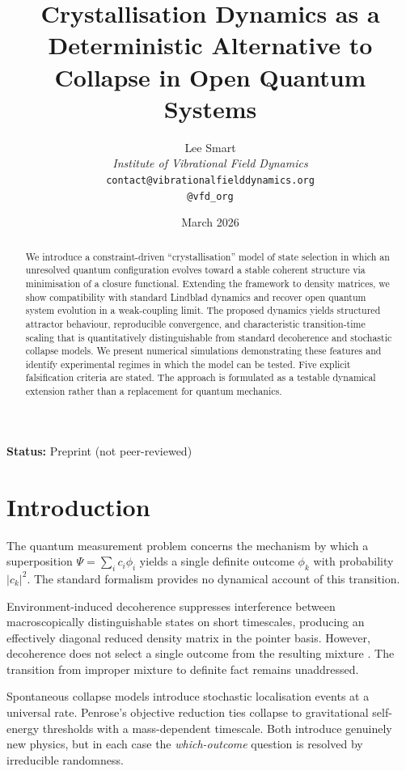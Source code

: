 \documentclass[12pt]{article}
\title{Crystallisation Dynamics as a Deterministic Alternative to Collapse in Open Quantum Systems}
\author{%
  Lee Smart\\[4pt]
  \textit{Institute of Vibrational Field Dynamics}\\[2pt]
  \texttt{contact@vibrationalfielddynamics.org}\\[2pt]
  \texttt{@vfd\_org}%
}
\date{March 2026}
\begin{document}
\maketitle

\noindent\textbf{Status:} Preprint (not peer-reviewed)

\begin{abstract}
We introduce a constraint-driven ``crystallisation'' model of state selection in which an unresolved quantum configuration evolves toward a stable coherent structure via minimisation of a closure functional. Extending the framework to density matrices, we show compatibility with standard Lindblad dynamics and recover open quantum system evolution in a weak-coupling limit. The proposed dynamics yields structured attractor behaviour, reproducible convergence, and characteristic transition-time scaling that is quantitatively distinguishable from standard decoherence and stochastic collapse models. We present numerical simulations demonstrating these features and identify experimental regimes in which the model can be tested. Five explicit falsification criteria are stated. The approach is formulated as a testable dynamical extension rather than a replacement for quantum mechanics.
\end{abstract}

\section{Introduction}

The quantum measurement problem concerns the mechanism by which a superposition $\Psi = \sum_i c_i \phi_i$ yields a single definite outcome $\phi_k$ with probability $|c_k|^2$. The standard formalism provides no dynamical account of this transition.

Environment-induced decoherence \citep{Zurek2003, JoosZeh1985} suppresses interference between macroscopically distinguishable states on short timescales, producing an effectively diagonal reduced density matrix in the pointer basis. However, decoherence does not select a single outcome from the resulting mixture \citep{Schlosshauer2005}. The transition from improper mixture to definite fact remains unaddressed.

Spontaneous collapse models \citep{GRW1986, BassiGhirardi2003} introduce stochastic localisation events at a universal rate. Penrose's objective reduction \citep{Penrose1996} ties collapse to gravitational self-energy thresholds with a mass-dependent timescale. Both introduce genuinely new physics, but in each case the \textit{which-outcome} question is resolved by irreducible randomness.
\end{document}
